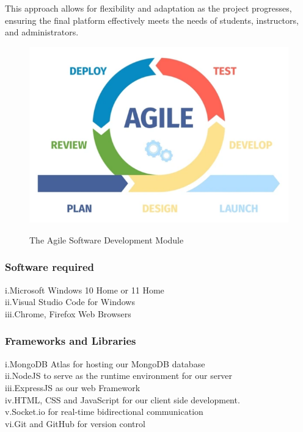 \documentclass[a4paper,12pt]{article}  %
\begin{document}
This approach allows for flexibility and adaptation as the project progresses,
ensuring the final platform effectively meets the needs of students,
instructors, and administrators.\\

\begin{figure}[H]
      \centering
      \includegraphics[width=1\textwidth]{figures/agile.png}
      \label{fig:1.6.0}
      \caption{The Agile Software Development Module}
\end{figure}

\subsubsection{Software required}
i.Microsoft Windows 10 Home or 11 Home\\ ii.Visual Studio Code for Windows \\
iii.Chrome, Firefox Web Browsers\\

\subsubsection{Frameworks and Libraries}
i.MongoDB Atlas for hosting our MongoDB database\\ ii.NodeJS to serve as the
runtime environment for our server\\ iii.ExpressJS as our web Framework\\
iv.HTML, CSS and JavaScript for our client side development.\\ v.Socket.io for
real-time bidirectional communication\\ vi.Git and GitHub for version control\\
\end{document}
